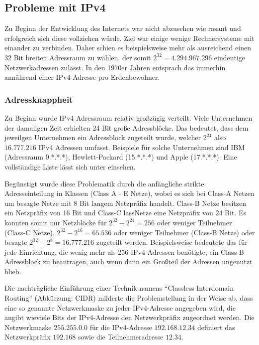 \documentclass[a4paper,12pt]{scrartcl}
\begin{document}
\subsection{Probleme mit IPv4}
Zu Beginn der Entwicklung des Internets war nicht abzusehen wie rasant und erfolgreich sich diese vollziehen würde. Ziel war einige wenige Rechnersysteme mit einander zu verbinden. Daher schien es beispielsweise mehr als ausreichend einen 32 Bit breiten Adressraum zu wählen, der somit $2^{32} = 4.294.967.296$ eindeutige Netzwerkadressen zulässt. In den 1970er Jahren entsprach das immerhin annährend einer IPv4-Adresse pro Erdenbewohner. 

\subsubsection{Adressknappheit}
Zu Beginn wurde IPv4 Adressraum relativ gro\ss{}z\"ugig verteilt. Viele Unternehmen der damaligen Zeit erhielten 24 Bit gro\ss{}e Adressbl\"ocke. Das bedeutet, dass dem jeweilgen Unternehmen ein Adressblock zugeteilt wurde, welcher $2^{24}$ also $16.777.216$ IPv4 Adressen umfasst. Beispiele f\"ur solche Unternehmen sind IBM (Adressraum 9.*.*.*), Hewlett-Packard (15.*.*.*) und Apple (17.*.*.*). Eine vollst\"andige Liste l\"asst sich unter \cite{ianaipv4list} einsehen.

Beg\"unstigt wurde diese Problematik durch die anf\"angliche strikte Adresseinteilung in Klassen (Class A - E Netze), wobei es sich bei Class-A Netzen um besagte Netze mit 8 Bit langem Netzpr\"afix handelt. Class-B Netze besitzen ein Netzpr\"afix von 16 Bit und Class-C lassNetze eine Netzpr\"afix von 24 Bit. Es konnten somit nur Netzbl\"ocke f\"ur $2^{32} - 2^{24} = 256$ oder weniger Teilnehmer (Class-C Netze), $2^{32} - 2^{16} = 65.536$ oder weniger Teilnehmer (Class-B Netze) oder besagte $2^{32} - 2^{8} = 16.777.216$ zugeteilt werden. Beispielsweise bedeutete das f\"ur jede Einrichtung, die wenig mehr als 256 IPv4-Adressen ben\"otigte, ein Class-B Adressblock zu beantragen, auch wenn dann ein Gro\ss{}teil der Adressen ungenutzt blieb.

Die nachtr\"agliche Einf\"uhrung einer Technik namens "`Classless Interdomain Routing"' (Abk\"urzung: CIDR) milderte die Problemstellung in der Weise ab, dass eine so genannte Netzwerkmaske zu jeder IPv4-Adresse angegeben wird, die angibt wieviele Bits der IPv4-Adresse den Netzwerkpr\"afix zugeordnet werden. Die Netzwerkmaske $255.255.0.0$ f\"ur die IPv4-Adresse $192.168.12.34$ definiert das Netzwerkpr\"afix $192.168$ sowie die Teilnehmeradresse $12.34$.
\end{document}
